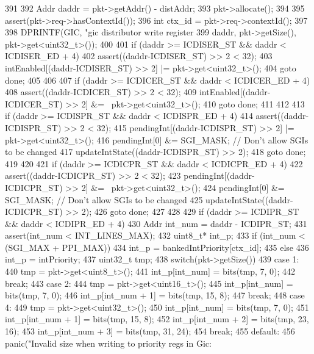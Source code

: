 \begin{DoxyCode}
391 {
392     Addr daddr = pkt->getAddr() - distAddr;
393     pkt->allocate();
394 
395     assert(pkt->req->hasContextId());
396     int ctx_id = pkt->req->contextId();
397 
398     DPRINTF(GIC, "gic distributor write register %
399             daddr, pkt->getSize(), pkt->get<uint32_t>());
400 
401     if (daddr >= ICDISER_ST && daddr < ICDISER_ED + 4) {
402         assert((daddr-ICDISER_ST) >> 2 < 32);
403         intEnabled[(daddr-ICDISER_ST) >> 2] |= pkt->get<uint32_t>();
404         goto done;
405     }
406 
407     if (daddr >= ICDICER_ST && daddr < ICDICER_ED + 4) {
408         assert((daddr-ICDICER_ST) >> 2 < 32);
409         intEnabled[(daddr-ICDICER_ST) >> 2] &= ~pkt->get<uint32_t>();
410         goto done;
411     }
412 
413     if (daddr >= ICDISPR_ST && daddr < ICDISPR_ED + 4) {
414         assert((daddr-ICDISPR_ST) >> 2 < 32);
415         pendingInt[(daddr-ICDISPR_ST) >> 2] |= pkt->get<uint32_t>();
416         pendingInt[0] &= SGI_MASK; // Don't allow SGIs to be changed
417         updateIntState((daddr-ICDISPR_ST) >> 2);
418         goto done;
419     }
420 
421     if (daddr >= ICDICPR_ST && daddr < ICDICPR_ED + 4) {
422         assert((daddr-ICDICPR_ST) >> 2 < 32);
423         pendingInt[(daddr-ICDICPR_ST) >> 2] &= ~pkt->get<uint32_t>();
424         pendingInt[0] &= SGI_MASK; // Don't allow SGIs to be changed
425         updateIntState((daddr-ICDICPR_ST) >> 2);
426         goto done;
427     }
428 
429     if (daddr >= ICDIPR_ST && daddr < ICDIPR_ED + 4) {
430         Addr int_num = daddr - ICDIPR_ST;
431         assert(int_num < INT_LINES_MAX);
432         uint8_t* int_p;
433         if (int_num < (SGI_MAX + PPI_MAX))
434             int_p = bankedIntPriority[ctx_id];
435         else
436             int_p = intPriority;
437         uint32_t tmp;
438         switch(pkt->getSize()) {
439           case 1:
440             tmp = pkt->get<uint8_t>();
441             int_p[int_num] = bits(tmp, 7, 0);
442             break;
443           case 2:
444             tmp = pkt->get<uint16_t>();
445             int_p[int_num] = bits(tmp, 7, 0);
446             int_p[int_num + 1] = bits(tmp, 15, 8);
447             break;
448           case 4:
449             tmp = pkt->get<uint32_t>();
450             int_p[int_num] = bits(tmp, 7, 0);
451             int_p[int_num + 1] = bits(tmp, 15, 8);
452             int_p[int_num + 2] = bits(tmp, 23, 16);
453             int_p[int_num + 3] = bits(tmp, 31, 24);
454             break;
455           default:
456             panic("Invalid size when writing to priority regs in Gic: %
}}}
\end{DoxyCode}
